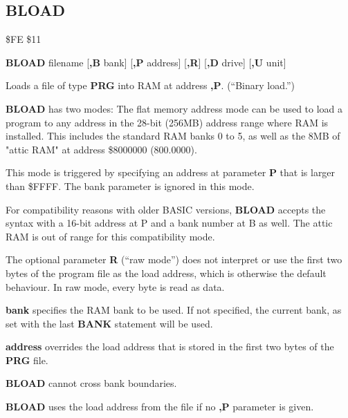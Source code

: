 \subsection{BLOAD}
\begin{description}[leftmargin=2cm,style=nextline]
\item [Token:]    \$FE \$11

\item [Format:]   {\bf BLOAD} filename [{\bf,B} bank] [{\bf,P} address] [{\bf,R}] [{\bf,D} drive] [{\bf,U} unit]

\item [Usage:]    Loads a file of type {\bf PRG} into RAM at address {\bf,P}. (``Binary load.'')

                  {\bf BLOAD} has two modes: The flat memory address mode can be used to load a program to any address in the 28-bit (256MB) address range where RAM is installed. This includes the standard RAM banks 0 to 5, as well as the 8MB of "attic RAM" at address \$8000000 (800.0000).

                  This mode is triggered by specifying an address at parameter {\bf P} that is larger than \$FFFF. The bank parameter is ignored in this mode.

                  For compatibility reasons with older BASIC versions, {\bf BLOAD} accepts the syntax with a 16-bit address at P and a bank number at B as well. The attic RAM is out of range for this compatibility mode.

                  The optional parameter {\bf R} (``raw mode'') does not interpret or use the first two bytes of the program file as the load address, which is otherwise the default behaviour. In raw mode, every byte is read as data.

                  \filenamedefinition

                  {\bf bank} specifies the RAM bank to be used. If not specified, the current bank, as set with the last {\bf BANK} statement will be used.

                  {\bf address} overrides the load address that is stored in the first two bytes of the {\bf PRG} file.

                  \drivedefinition

                  \unitdefinition

\item [Remarks:]  {\bf BLOAD} cannot cross bank boundaries.

                  {\bf BLOAD} uses the load address from the file if no {\bf,P} parameter is given.


\end{description}
